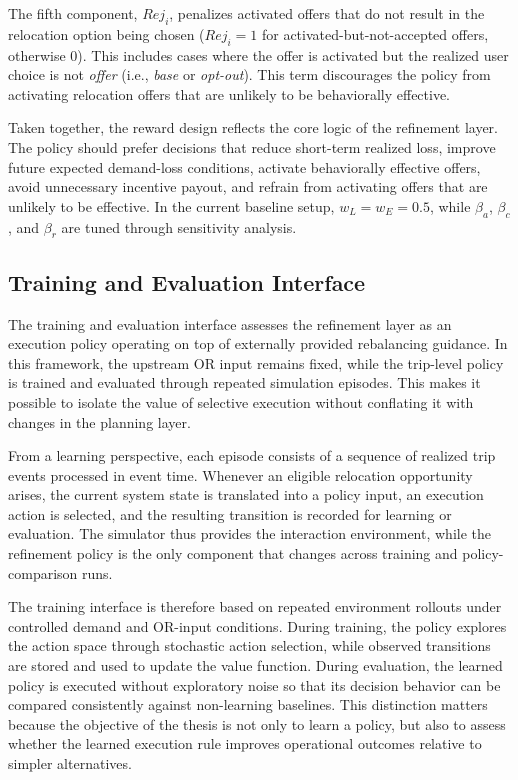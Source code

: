 The fifth component, \(Rej_i\), penalizes activated offers that do not result in the relocation option being chosen (\(Rej_i=1\) for activated-but-not-accepted offers, otherwise \(0\)). This includes cases where the offer is activated but the realized user choice is not \textit{offer} (i.e., \textit{base} or \textit{opt-out}). This term discourages the policy from activating relocation offers that are unlikely to be behaviorally effective.

Taken together, the reward design reflects the core logic of the refinement layer. The policy should prefer decisions that reduce short-term realized loss, improve future expected demand-loss conditions, activate behaviorally effective offers, avoid unnecessary incentive payout, and refrain from activating offers that are unlikely to be effective. In the current baseline setup, \(w_L=w_E=0.5\), while \(\beta_a\), \(\beta_c\), and \(\beta_r\) are tuned through sensitivity analysis.


\subsection{Training and Evaluation Interface}

The training and evaluation interface assesses the refinement layer as an execution policy operating on top of externally provided rebalancing guidance. In this framework, the upstream OR input remains fixed, while the trip-level policy is trained and evaluated through repeated simulation episodes. This makes it possible to isolate the value of selective execution without conflating it with changes in the planning layer.

From a learning perspective, each episode consists of a sequence of realized trip events processed in event time. Whenever an eligible relocation opportunity arises, the current system state is translated into a policy input, an execution action is selected, and the resulting transition is recorded for learning or evaluation. The simulator thus provides the interaction environment, while the refinement policy is the only component that changes across training and policy-comparison runs.

The training interface is therefore based on repeated environment rollouts under controlled demand and OR-input conditions. During training, the policy explores the action space through stochastic action selection, while observed transitions are stored and used to update the value function. During evaluation, the learned policy is executed without exploratory noise so that its decision behavior can be compared consistently against non-learning baselines. This distinction matters because the objective of the thesis is not only to learn a policy, but also to assess whether the learned execution rule improves operational outcomes relative to simpler alternatives.

